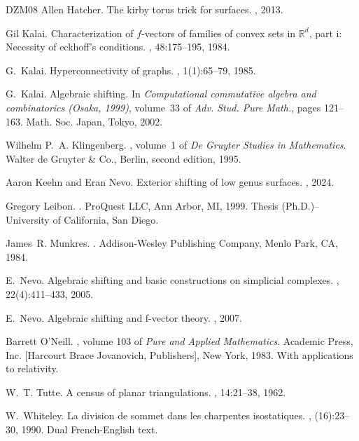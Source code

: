 \documentclass[11pt]{article}
\numberwithin{claimcounter}{theorem}
\theoremstyle{remark}
\theoremstyle{definition}
\numberwithin{theorem}{section}
\begin{document}
\begin{thebibliography}{DZM08}
Allen Hatcher.
\newblock The kirby torus trick for surfaces.
, 2013.

Gil Kalai.
\newblock Characterization of \(f\)-vectors of families of convex sets in
  \(\mathbb{R}^d\), part i: Necessity of eckhoff’s conditions.
, 48:175--195, 1984.

G.~Kalai.
\newblock Hyperconnectivity of graphs.
, 1(1):65--79, 1985.

G.~Kalai.
\newblock Algebraic shifting.
\newblock In {\em Computational commutative algebra and combinatorics ({O}saka,
  1999)}, volume~33 of {\em Adv. Stud. Pure Math.}, pages 121--163. Math. Soc.
  Japan, Tokyo, 2002.

Wilhelm P.~A. Klingenberg.
, volume~1 of {\em De Gruyter Studies in
  Mathematics}.
\newblock Walter de Gruyter \& Co., Berlin, second edition, 1995.

Aaron Keehn and Eran Nevo.
\newblock Exterior shifting of low genus surfaces.
, 2024.

Gregory Leibon.
.
\newblock ProQuest LLC, Ann Arbor, MI, 1999.
\newblock Thesis (Ph.D.)--University of California, San Diego.

James~R. Munkres.
.
\newblock Addison-Wesley Publishing Company, Menlo Park, CA, 1984.

E.~Nevo.
\newblock Algebraic shifting and basic constructions on simplicial complexes.
, 22(4):411--433, 2005.

E.~Nevo.
\newblock Algebraic shifting and f-vector theory.
, 2007.

Barrett O'Neill.
, volume 103 of {\em Pure and Applied
  Mathematics}.
\newblock Academic Press, Inc. [Harcourt Brace Jovanovich, Publishers], New
  York, 1983.
\newblock With applications to relativity.

W.~T. Tutte.
\newblock A census of planar triangulations.
, 14:21--38, 1962.

W.~Whiteley.
\newblock La division de sommet dans les charpentes isostatiques.
, (16):23--30, 1990.
\newblock Dual French-English text.

\end{thebibliography}
\end{document}
